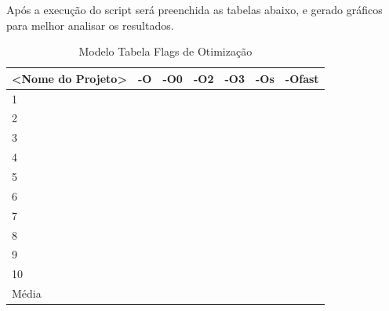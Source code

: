 Após a execução do script será preenchida as tabelas abaixo, e gerado gráficos para melhor
analisar os resultados. 

\begin{table}[h]
\centering
\caption{Modelo Tabela Flags de Otimização}
\label{my-label}
\begin{tabular}{lllllll}
\hline
\textbf{<Nome do Projeto>} & \textbf{-O} & \textbf{-O0} & \textbf{-O2} & \textbf{-O3} & \textbf{-Os} & \textbf{-Ofast} \\ \toprule
1                                    &    &     &     &     &     &        \\ \midrule
2                                    &    &     &     &     &     &        \\ \midrule
3                                    &    &     &     &     &     &        \\ \midrule
4                                    &    &     &     &     &     &        \\ \midrule
5                                    &    &     &     &     &     &        \\ \midrule
6                                    &    &     &     &     &     &        \\ \midrule
7                                    &    &     &     &     &     &        \\ \midrule
8                                    &    &     &     &     &     &        \\ \midrule
9                                    &    &     &     &     &     &        \\ \midrule
10                                   &    &     &     &     &     &        \\ \midrule
Média                                &    &     &     &     &     &        \\ \bottomrule
\end{tabular}
\end{table}

